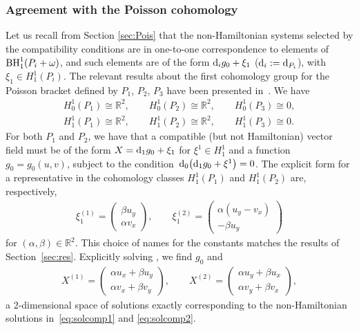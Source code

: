 \documentclass[10pt,a4paper]{amsart}
\numberwithin{equation}{section}
\begin{document}
\subsubsection{Agreement with the Poisson cohomology}
Let us recall from Section \ref{sec:Pois} that the non-Hamiltonian systems selected by the compatibility conditions are in one-to-one correspondence to elements of ${\rm BH}^1_1(P_i+\omega)$, and such elements are of the form ${\rm d}_i g_0+\xi_1$ (${\rm d}_i:={\rm d}_{P_i}$), with $\xi_1\in H^1_1(P_i)$. The relevant results about the first cohomology group for the Poisson bracket defined by $P_1$, $P_2$, $P_3$ have been presented in~\cite{casati2015deformations}. We have
\begin{gather*}
H^1_0(P_1)\cong \mathbb{R}^2, \qquad H^1_0(P_2)\cong \mathbb{R}^2, \qquad H^1_0(P_3)\cong 0, \\
H^1_1(P_1)\cong \mathbb{R}^2, \qquad H^1_1(P_2)\cong \mathbb{R}^2 , \qquad H^1_1(P_3)\cong 0.
\end{gather*}
For both $P_1$ and $P_2$, we have that a compatible (but not Hamiltonian) vector field must be of the form
$X={\rm d}_1 g_0+\xi_1$
for $\xi^1\in H^1_1$ and a function $g_0=g_0(u,v)$, subject to the condition~${{\rm d}_0\big({\rm d}_1g_0+\xi^1\big)=0}$. The explicit form for a representative in the cohomology classes $H^1_1(P_1)$ and $H^1_1(P_2)$ are, respectively,
\begin{gather*}
\xi_1^{(1)}=\begin{pmatrix} \beta u_y\\ \alpha v_x\end{pmatrix},\qquad\xi_1^{(2)}=\begin{pmatrix} \alpha (u_y-v_x)\\-\beta u_y\end{pmatrix}
\end{gather*}
for $(\alpha,\beta)\in\mathbb{R}^2$. This choice of names for the constants matches the results of Section~\ref{sec:res}. Explicitly solving , we find $g_0$ and
\begin{gather*}%
X^{(1)}=\begin{pmatrix}\alpha u_x+\beta u_y\\\alpha v_x+\beta v_y\end{pmatrix}, \qquad X^{(2)}=\begin{pmatrix}\alpha u_y+\beta u_x\\ \alpha v_y+\beta v_x\end{pmatrix},
\end{gather*}
a 2-dimensional space of solutions exactly corresponding to the non-Hamiltonian solutions in~\eqref{eq:solcomp1} and \eqref{eq:solcomp2}.
\end{document}
